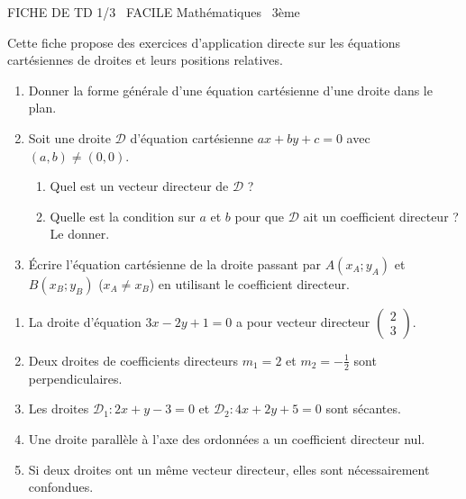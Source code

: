 \documentclass[11pt]{article}
\begin{document}
\begin{tcolorbox}[enhanced,colback=popink,colframe=popink,arc=10pt,boxrule=0pt,left=12pt,right=12pt,top=9pt,bottom=9pt]
{\color{white}\popxbold\small FICHE DE TD 1/3 \textbullet\ FACILE \hfill Mathématiques \textbullet\ 3ème\par}
\end{tcolorbox}
\vspace{4pt}
Cette fiche propose des exercices d'application directe sur les équations cartésiennes de droites et leurs positions relatives.

\begin{exercice}
\begin{enumerate}
    \item Donner la forme générale d'une équation cartésienne d'une droite dans le plan.
    \item Soit une droite $\mathcal{D}$ d'équation cartésienne $ax+by+c=0$ avec $(a,b)\neq(0,0)$. 
    \begin{enumerate}
        \item Quel est un vecteur directeur de $\mathcal{D}$ ?
        \item Quelle est la condition sur $a$ et $b$ pour que $\mathcal{D}$ ait un coefficient directeur ? Le donner.
    \end{enumerate}
    \item Écrire l'équation cartésienne de la droite passant par $A(x_A;y_A)$ et $B(x_B;y_B)$ ($x_A\neq x_B$) en utilisant le coefficient directeur.
\end{enumerate}
\end{exercice}

\begin{exercice}
\begin{enumerate}
    \item La droite d'équation $3x-2y+1=0$ a pour vecteur directeur $\begin{pmatrix}2\\3\end{pmatrix}$.
    \item Deux droites de coefficients directeurs $m_1=2$ et $m_2=-\frac{1}{2}$ sont perpendiculaires.
    \item Les droites $\mathcal{D}_1: 2x+y-3=0$ et $\mathcal{D}_2: 4x+2y+5=0$ sont sécantes.
    \item Une droite parallèle à l'axe des ordonnées a un coefficient directeur nul.
    \item Si deux droites ont un même vecteur directeur, elles sont nécessairement confondues.
\end{enumerate}
\end{exercice}
\end{document}
